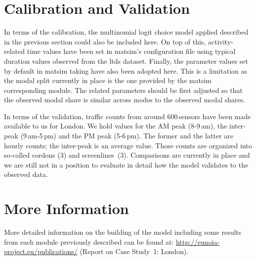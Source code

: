 \section{Calibration and Validation}
In terms of the calibration, the multinomial logit choice model applied described in the previous section could also be included here. On top of this, activity-related time values have been set in \gls{matsim}'s configuration file using typical duration values observed from the \gls{ltds} dataset. Finally, the parameter values set by default in \gls{matsim} taking have also been adopted here. This is a limitation as the modal split currently in place is the one provided by the \gls{matsim} corresponding module. The related parameters should be first adjusted so that the observed modal share is similar across modes to the observed modal shares.

In terms of the validation, traffic counts from around 600\,sensors have been made available to us for London. We hold values for the AM peak (8-9\,am), the inter-peak (9\,am-5\,pm) and the PM peak (5-6\,pm). The former and the latter are hourly counts; the inter-peak is an average value. Those counts are organized into so-called cordons (3) and screenlines~(3). Comparisons are currently in place and we are still not in a position to evaluate in detail how the model validates to the observed data.

\section{More Information}
More detailed information on the building of the model including some results from each module previously described can be found at: \url{http://eunoia-project.eu/publications/} (Report on Case Study~1: London).

